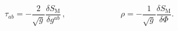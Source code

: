 \begin{equation*}
\tau _{ab}=-\frac{2}{\sqrt{g}}\frac{\delta S_{\mathrm{M}}}{\delta g^{ab}}%
\,,\ \ \ \ \ \ \ \ \ \ \ \ \ \ \ \ \ \ \ \ \ \ \ \ \ \ \ \ \ \ \rho =-\frac{1%
}{\sqrt{g}}\frac{\delta S_{\mathrm{M}}}{\delta \Phi }.
\end{equation*}

